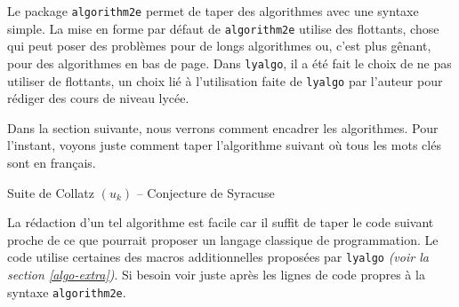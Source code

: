 Le package \verb+algorithm2e+ permet de taper des algorithmes avec une syntaxe simple. La mise en forme par défaut de \verb+algorithm2e+ utilise des flottants, chose qui peut poser des problèmes pour de longs algorithmes ou, c'est plus gênant, pour des algorithmes en bas de page. Dans \verb+lyalgo+, il a été fait le choix de ne pas utiliser de flottants, un choix lié à l'utilisation faite de \verb+lyalgo+ par l'auteur pour rédiger des cours de niveau lycée.


\medskip

Dans la section suivante, nous verrons comment encadrer les algorithmes. Pour l'instant, voyons juste comment taper l'algorithme suivant où tous les mots clés sont en français.


\bigskip


\begin{algo*}
    \caption{Suite de Collatz $(u_k)$ -- Conjecture de Syracuse}


    \BlankLine    %

\end{algo*}


\bigskip


La rédaction d'un tel algorithme est facile car il suffit de taper le code suivant proche de ce que pourrait proposer un langage classique de programmation. Le code utilise certaines des macros additionnelles proposées par \verb+lyalgo+ \emph{(voir la section \ref{algo-extra})}. Si besoin voir juste après les lignes de code propres à la syntaxe \verb+algorithm2e+. 


